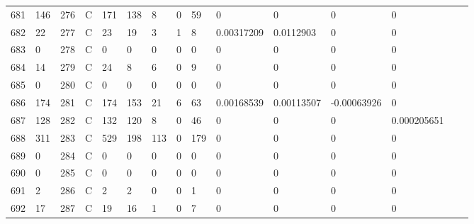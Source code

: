 \begin{longtable}{lllllllllllllll}
	681 & 146               & 276 & C   & 171               & 138               & 8                 & 0    & 59         & 0              & 0              & 0             & 0            \\
	682 & 22                & 277 & C   & 23                & 19                & 3                 & 1    & 8          & 0.00317209     & 0.0112903      & 0             & 0            \\
	683 & 0                 & 278 & C   & 0                 & 0                 & 0                 & 0    & 0          & 0              & 0              & 0             & 0            \\
	684 & 14                & 279 & C   & 24                & 8                 & 6                 & 0    & 9          & 0              & 0              & 0             & 0            \\
	685 & 0                 & 280 & C   & 0                 & 0                 & 0                 & 0    & 0          & 0              & 0              & 0             & 0            \\
	686 & 174               & 281 & C   & 174               & 153               & 21                & 6    & 63         & 0.00168539     & 0.00113507     & -0.00063926   & 0            \\
	687 & 128               & 282 & C   & 132               & 120               & 8                 & 0    & 46         & 0              & 0              & 0             & 0.000205651  \\
	688 & 311               & 283 & C   & 529               & 198               & 113               & 0    & 179        & 0              & 0              & 0             & 0            \\
	689 & 0                 & 284 & C   & 0                 & 0                 & 0                 & 0    & 0          & 0              & 0              & 0             & 0            \\
	690 & 0                 & 285 & C   & 0                 & 0                 & 0                 & 0    & 0          & 0              & 0              & 0             & 0            \\
	691 & 2                 & 286 & C   & 2                 & 2                 & 0                 & 0    & 1          & 0              & 0              & 0             & 0            \\
	692 & 17                & 287 & C   & 19                & 16                & 1                 & 0    & 7          & 0              & 0              & 0             & 0            \\

\end{longtable}
